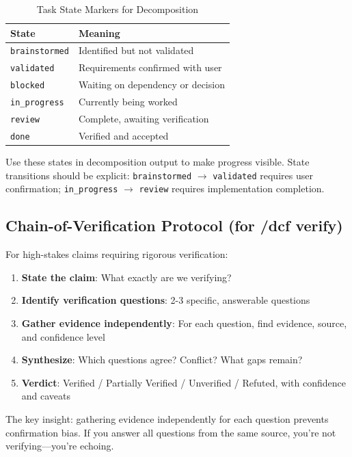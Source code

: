 \begin{table}[H]
\centering
\begin{tabular}{ll}
\toprule
\textbf{State} & \textbf{Meaning} \\
\midrule
\texttt{brainstormed} & Identified but not validated \\
\texttt{validated} & Requirements confirmed with user \\
\texttt{blocked} & Waiting on dependency or decision \\
\texttt{in\_progress} & Currently being worked \\
\texttt{review} & Complete, awaiting verification \\
\texttt{done} & Verified and accepted \\
\bottomrule
\end{tabular}
\caption{Task State Markers for Decomposition}
\end{table}

Use these states in decomposition output to make progress visible. State transitions should be explicit: \texttt{brainstormed} $\rightarrow$ \texttt{validated} requires user confirmation; \texttt{in\_progress} $\rightarrow$ \texttt{review} requires implementation completion.

\subsection{Chain-of-Verification Protocol (for /dcf verify)}

For high-stakes claims requiring rigorous verification:

\begin{enumerate}
    \item \textbf{State the claim}: What exactly are we verifying?
    \item \textbf{Identify verification questions}: 2-3 specific, answerable questions
    \item \textbf{Gather evidence independently}: For each question, find evidence, source, and confidence level
    \item \textbf{Synthesize}: Which questions agree? Conflict? What gaps remain?
    \item \textbf{Verdict}: Verified / Partially Verified / Unverified / Refuted, with confidence and caveats
\end{enumerate}

The key insight: gathering evidence independently for each question prevents confirmation bias. If you answer all questions from the same source, you're not verifying---you're echoing.

